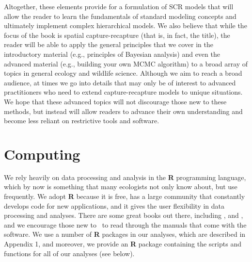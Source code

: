 Altogether, these %
elements
provide for a formulation of SCR models that will allow the reader to
learn the fundamentals of standard modeling concepts and ultimately
implement complex hierarchical models.
We also believe that
while the focus of the book is spatial capture-recapture (that is,
in fact, the title), the reader will be able to apply the general
principles that we cover in the introductory material (e.g., principles
of Bayesian analysis) and even the advanced material (e.g., building
your own MCMC algorithm) to a broad array of topics in general ecology
and wildlife science.
Although we aim to reach a broad audience, at times we go into details
that may only be of interest to advanced practitioners who need to
extend capture-recapture models to unique situations.  We hope that
these advanced topics will not discourage those new to these methods,
but instead
will
allow readers to advance their own
understanding and become less reliant on restrictive tools and
software.



\section*{Computing}

We rely heavily on data processing and analysis in the {\bf R}
programming language, which by now is something that many ecologists
not only know about, but use frequently.  We adopt {\bf R} because it
is free, has a large community that constantly develops code for new
applications, and it gives the user flexibility in data processing and
analyses.  There are some great books out there, including %
\citet{venables_ripley:2002}, \citet{bolker:2008} and \citet{zuur_etal:2009}, and we encourage those
new to \R~to read through the manuals that come with the software.
We use a number of {\bf
  R} packages in our analyses, which are described in Appendix 1, and
moreover, we provide an {\bf R} package containing the scripts and
functions for all of our analyses (see below).

